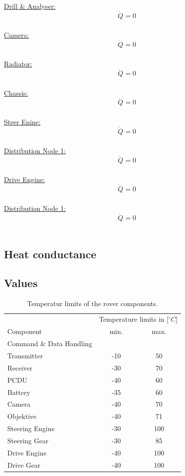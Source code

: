 \underline{Drill \& Analyser:}
\[ \dot{Q}_{} = 0  \]\\[2em]

\underline{Camera:}
\[ \dot{Q}_{} = 0  \]\\[2em]

\underline{Radiator:}
\[ \dot{Q}_{} = 0  \]\\[2em]

\underline{Chassis:}
\[ \dot{Q}_{} = 0  \]\\[2em]

\underline{Steer Enine:}
\[ \dot{Q}_{} = 0  \]\\[2em]

\underline{Distribution Node 1:}
\[ \dot{Q}_{} = 0  \]\\[2em]

\underline{Drive Engine:}
\[ \dot{Q}_{} = 0  \]\\[2em]

\underline{Distribution Node 1:}
\[ \dot{Q}_{} = 0  \]\\[2em]


\subsection{Heat conductance}


\subsection{Values}
\begin{table}[htb]
	\centering
	\begin{tabular}{lcc}
		\hline
		 & \multicolumn{2}{l}{Temperature limits in [$^\circ C$]} \\ 
		Component	&	min. & max. \\\hline
		Command \& Data Handling & & \\
		Transmitter & -10 & 50 \\
		Receiver & -30 & 70 \\
		PCDU & -40 & 60 \\
		Battery & -35 & 60 \\
		Camera & -40 & 70 \\
		Objektive  & -40 & 71 \\
		Steering Engine & -30 & 100 \\
		Steering Gear & -30 & 85 \\
		Drive Engine & -40 & 100 \\
		Drive Gear & -40 & 100 \\ \hline
	\end{tabular}
	\caption{Temperatur limits of the rover components.}
	\label{tab:tsc_limits}
\end{table}

